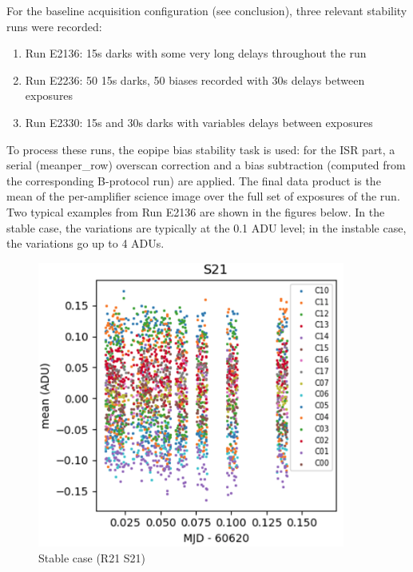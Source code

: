 For the baseline acquisition configuration (see conclusion), three
relevant stability runs were recorded:

\begin{enumerate}
\tightlist
\item
  Run E2136: 15s darks with some very long delays throughout the run
\item
  Run E2236: 50 15s darks, 50 biases recorded with 30s delays between
  exposures
\item
  Run E2330: 15s and 30s darks with variables delays between exposures
\end{enumerate}

To process these runs, the eo\label{pipe}{pipe} bias
stability task is used: for the ISR part, a serial
(\textquotesingle mean\label{per_row}{per\_row}\textquotesingle)
overscan correction and a bias subtraction (computed from the
corresponding B-protocol run) are applied. The final data product is the
mean of the per-amplifier science image over the full set of exposures
of the run. Two typical examples from Run E2136 are shown in the figures
below. In the stable case, the variations are typically at the 0.1 ADU
level; in the instable case, the variations go up to 4 ADUs.

\begin{figure}
\begin{centering}
\includegraphics[width=0.9\textwidth]{sections/figures/E2136_R21_S21.png}
\end{centering}
\caption{Stable case (R21 S21)}
\end{figure}

